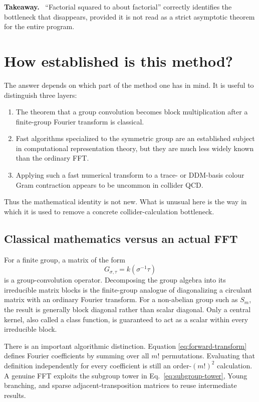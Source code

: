 \documentclass[11pt,a4paper]{article}
\newenvironment{takeaway}
  {\par\medskip\noindent\begin{minipage}{\linewidth}
   \color{blue!50!black}\textbf{Takeaway.}\ \color{black}}
  {\end{minipage}\par\medskip}
\begin{document}
\begin{takeaway}
``Factorial squared to about factorial'' correctly identifies the bottleneck
that disappears, provided it is not read as a strict asymptotic theorem for
the entire program.
\end{takeaway}

\section{How established is this method?}

The answer depends on which part of the method one has in mind.  It is useful
to distinguish three layers:
\begin{enumerate}
  \item The theorem that a group convolution becomes block multiplication
        after a finite-group Fourier transform is classical.
  \item Fast algorithms specialized to the symmetric group are an established
        subject in computational representation theory, but they are much less
        widely known than the ordinary FFT.
  \item Applying such a fast numerical transform to a trace- or DDM-basis
        colour Gram contraction appears to be uncommon in collider QCD.
\end{enumerate}
Thus the mathematical identity is not new.  What is unusual here is the way
in which it is used to remove a concrete collider-calculation bottleneck.

\subsection{Classical mathematics versus an actual FFT}

For a finite group, a matrix of the form
\begin{equation}
  G_{\sigma,\tau}=k(\sigma^{-1}\tau)
\end{equation}
is a group-convolution operator.  Decomposing the group algebra into its
irreducible matrix blocks is the finite-group analogue of diagonalizing a
circulant matrix with an ordinary Fourier transform.  For a non-abelian group
such as $S_m$, the result is generally block diagonal rather than scalar
diagonal.  Only a central kernel, also called a class function, is guaranteed
to act as a scalar within every irreducible block.

There is an important algorithmic distinction.  Equation
\eqref{eq:forward-transform} defines Fourier coefficients by summing over all
$m!$ permutations.  Evaluating that definition independently for every
coefficient is still an order-$(m!)^2$ calculation.  A genuine FFT exploits
the subgroup tower in Eq.~\eqref{eq:subgroup-tower}, Young branching, and
sparse adjacent-transposition matrices to reuse intermediate results.
\end{document}
